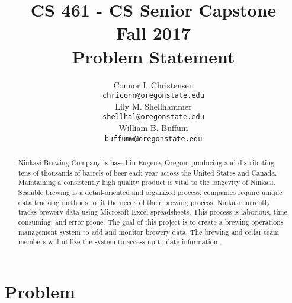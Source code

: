 \documentclass[draftclsnofoot,onecolumn,letterpaper,10pt]{IEEEtran}
\title{CS 461 - CS Senior Capstone
	\\Fall 2017
	\\Problem Statement
}
\author{
	Connor I. Christensen \\
	\texttt{chriconn@oregonstate.edu}
	\\
	Lily M. Shellhammer \\
	\texttt{shellhal@oregonstate.edu}
	\\
	William B. Buffum \\
	\texttt{buffumw@oregonstate.edu}
}
\begin{document}
\begin{titlingpage}
    \maketitle
    \begin{abstract}
					Ninkasi Brewing Company is based in Eugene, Oregon, producing and distributing tens of thousands of barrels of beer each year across the United States and Canada. Maintaining a consistently high quality product is vital to the longevity of Ninkasi. Scalable brewing is a detail-oriented and organized process; companies require unique data tracking methods to fit the needs of their brewing process. Ninkasi currently tracks brewery data using Microsoft Excel spreadsheets. This process is laborious, time consuming, and error prone. The goal of this project is to create a brewing operations management system to add and monitor brewery data. The brewing and cellar team members will utilize the system to access up-to-date information. 

    \end{abstract}
\end{titlingpage}

\section{\textbf{Problem}}
\end{document}
